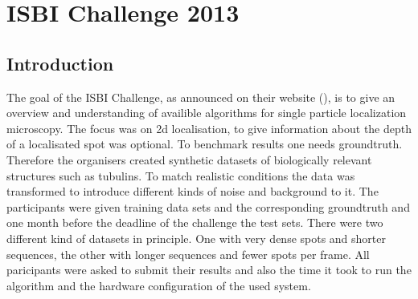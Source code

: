 \chapter{ISBI Challenge 2013}
\section{Introduction}
The goal of the ISBI Challenge, as announced on their website (\cite{challenge}), is to give an overview and understanding of availible algorithms for single particle localization microscopy. The focus was on 2d localisation, to give information about the depth of a localisated spot was optional. To benchmark results one needs groundtruth. Therefore the organisers created synthetic datasets of biologically relevant structures such as tubulins. To match realistic conditions the data was transformed to introduce different kinds of noise and background to it.\newline
The participants were given training data sets and the corresponding groundtruth and one month before the deadline of the challenge the test sets. There were two different kind of datasets in principle. One with very dense spots and shorter sequences, the other with longer sequences and fewer spots per frame.\newline
All paricipants were asked to submit their results and also the time it took to run the algorithm and the hardware configuration of the used system.

